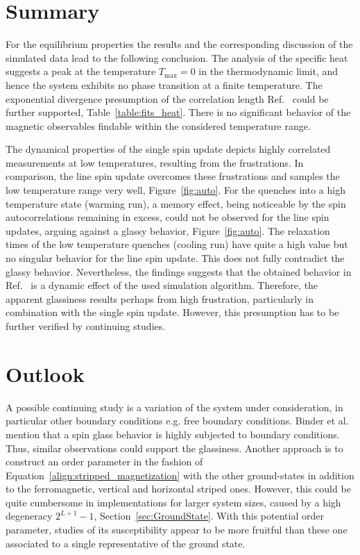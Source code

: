 \label{cha:conclusion}

\section{Summary}

For the equilibrium properties the results and the corresponding discussion of the simulated data lead to the following conclusion. 
The analysis of the specific heat suggests a peak at the temperature $T_\mathrm{max}\!=\!0$ in the thermodynamic limit, 
and hence the system exhibits no phase transition at a finite temperature. The exponential divergence presumption of the correlation 
length Ref.~\cite{Lee2024} could be further supported, Table~\ref{table:fits_heat}. 
There is no significant behavior of the magnetic observables findable within the considered temperature range.

The dynamical properties of the single spin update depicts highly correlated measurements at low temperatures, resulting 
from the frustrations. In comparison, the line spin update overcomes these frustrations and samples the low temperature range very well, 
Figure~\ref{fig:auto}. For the quenches into a high temperature state (warming run), a memory effect, being noticeable by the spin autocorrelations remaining in excess, 
could not be observed for the line spin updates, arguing against a glassy behavior, Figure~\ref{fig:auto}. The relaxation times of the low temperature
quenches (cooling run) have quite a high value but no singular behavior for the line spin update. This does not fully contradict the glassy behavior. Nevertheless, 
the findings suggests that the obtained behavior in Ref.~\cite{Timmons2018} is a dynamic effect of the used simulation algorithm. Therefore, 
the apparent glassiness results perhaps from high frustration, particularly in combination with the single spin update. However, this presumption has to be further 
verified by continuing studies.


\section{Outlook}

A possible continuing study is a variation of the system under consideration, in particular other boundary conditions e.g. free boundary conditions.
Binder et al.~\cite{Binder1986} mention that a spin glass behavior is highly subjected to boundary conditions. Thus, similar observations could 
support the glassiness. Another approach is to construct an order parameter in the fashion of Equation~\eqref{align:stripped_magnetization} with 
the other ground-states in addition to the ferromagnetic, vertical and horizontal striped ones. However, this could be quite cumbersome in implementations for 
larger system sizes, caused by a high degeneracy $2^{L+1}\!-\!1$, Section~\ref{sec:GroundState}. With this potential order parameter, studies of its 
susceptibility appear to be more fruitful than these one associated to a single representative of the ground state.

